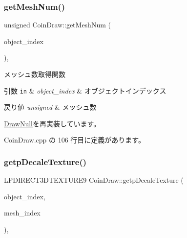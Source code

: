 \subsubsection{\texorpdfstring{get\+Mesh\+Num()}{getMeshNum()}}
{\footnotesize\ttfamily unsigned Coin\+Draw\+::get\+Mesh\+Num (\begin{DoxyParamCaption}\item[{unsigned}]{object\+\_\+index }\end{DoxyParamCaption})\hspace{0.3cm}{\ttfamily [override]}, {\ttfamily [virtual]}}



メッシュ数取得関数 


\begin{DoxyParams}[1]{引数}
\mbox{\tt in}  & {\em object\+\_\+index} & オブジェクトインデックス \\
\hline
\end{DoxyParams}

\begin{DoxyRetVals}{戻り値}
{\em unsigned} & メッシュ数 \\
\hline
\end{DoxyRetVals}


\mbox{\hyperlink{class_draw_null_a4c566a37d27fac3dcf76c7970443f375}{Draw\+Null}}を再実装しています。



 Coin\+Draw.\+cpp の 106 行目に定義があります。

\mbox{\label{class_coin_draw_af99db1c0db2ed6b3ba429f23cd44279b}} 
\subsubsection{\texorpdfstring{getp\+Decale\+Texture()}{getpDecaleTexture()}}
{\footnotesize\ttfamily L\+P\+D\+I\+R\+E\+C\+T3\+D\+T\+E\+X\+T\+U\+R\+E9 Coin\+Draw\+::getp\+Decale\+Texture (\begin{DoxyParamCaption}\item[{unsigned}]{object\+\_\+index,  }\item[{unsigned}]{mesh\+\_\+index }\end{DoxyParamCaption})\hspace{0.3cm}{\ttfamily [override]}, {\ttfamily [virtual]}}



